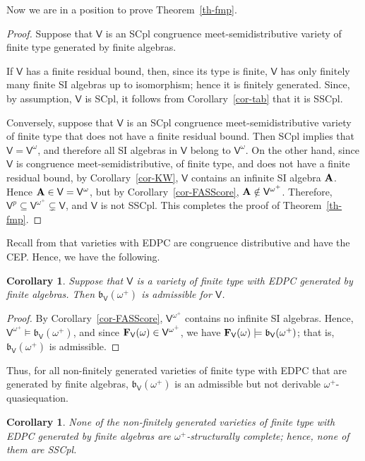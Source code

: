 \documentclass[submission,copyright,creativecommons]{eptcs}
\newtheorem{cor}[theorem]{Corollary}
\theoremstyle{definition}
\newcommand{\alg}[1]{{{\textbf{\upshape #1}}}}
\newcommand{\vv}[1]{\mathsf {#1}}
\newcommand{\vV}{\vv V}
\newcommand{\FrV}{\alg F_\vv V(\omega)}
\newcommand{\WsV}{\mathfrak{b}_\vv V}
\newcommand{\VP}{\vv V^p}
\begin{document}
Now we are in a position to prove Theorem~\ref{th-fmp}.

\begin{proof} 
	Suppose that $\vv V$ is an SCpl congruence meet-semidistributive variety of finite type generated by finite algebras.
	
	If $\vv V$ has a finite residual bound, then, since its type is finite, $\vv V$ has only finitely many finite SI algebras up to isomorphism; hence it is finitely generated. Since, by assumption, $\vV$ is SCpl, it follows from Corollary~\ref{cor-tab} that it is SSCpl.
	
	Conversely, suppose that $\vv V$ is an SCpl congruence meet-semidistributive variety of finite type that does not have a finite residual bound. Then SCpl implies that $\vv V = \vV^\omega$, and therefore all SI algebras in $\vv V$ belong to $\vV^\omega$. On the other hand, since $\vv V$ is congruence meet-semidistributive, of finite type, and does not have a finite residual bound, by Corollary~\ref{cor-KW}, $\vv V$ contains an infinite SI algebra $\alg A$. Hence $\alg A \in \vv V = \vV^\omega$, but by Corollary~\ref{cor-FASScore}, $\alg A \notin \vV^{\omega^+}$. Therefore, $\VP \subseteq \vV^{\omega^+} \subsetneq \vv V$, and $\vv V$ is not SSCpl. This completes the proof of Theorem~\ref{th-fmp}.
\end{proof}

Recall from \cite{BlkPgz1} that varieties with EDPC are congruence distributive and have the CEP. Hence, we have the following.

\begin{cor}\label{cor-Wradm}
	Suppose that $\vv V$ is a variety of finite type with EDPC generated by finite algebras. Then $\WsV(\omega^+)$ is admissible for $\vv V$. 
\end{cor}

\begin{proof}
	By Corollary~\ref{cor-FASScore}, $\vV^{\omega^+}$ contains no infinite SI algebras. Hence, $\vV^{\omega^+} \models \WsV(\omega^+)$, and since $\FrV \in \vV^{\omega^+}$, we have $\FrV \models \WsV(\omega^+)$; that is, $\WsV(\omega^+)$ is admissible.
\end{proof}

Thus, for all non-finitely generated varieties of finite type with EDPC that are generated by finite algebras, $\WsV(\omega^+)$ is an admissible but not derivable $\omega^+$-quasiequation.

\begin{cor}\label{cor-EDPC}
	None of the non-finitely generated varieties of finite type with EDPC generated by finite algebras are $\omega^+$-structurally complete; hence, none of them are SSCpl. 
\end{cor}
\end{document}
